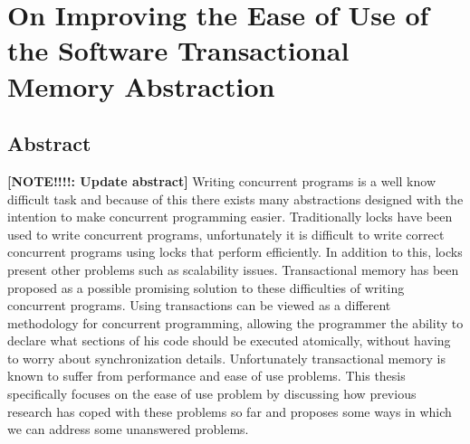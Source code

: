 \documentclass[11pt]{book}
\newcommand{\anote}[1]{{\bf [NOTE!!!!: #1]}}
\begin{document}








\section*{On Improving the Ease of Use of the Software Transactional Memory Abstraction}
\subsection*{Abstract}
\anote{Update abstract}
Writing concurrent programs is a well know difficult task and because
of this there exists many abstractions designed with the intention to make concurrent programming
easier. Traditionally locks have been used to write concurrent programs, unfortunately it is
difficult to write correct concurrent programs using locks that perform efficiently. In addition
to this, locks present other problems such as scalability issues. Transactional memory has been
proposed as a possible promising solution to these difficulties of writing concurrent programs.
Using transactions can be viewed as a different methodology for concurrent programming, allowing
the programmer the ability to declare what sections of his code should be executed atomically,
without having to worry about synchronization details. Unfortunately transactional memory is
known to suffer from performance and ease of use problems. This thesis specifically focuses on
the ease of use problem by discussing how previous research has coped with these problems so
far and proposes some ways in which we can address some unanswered problems.
\end{document}
